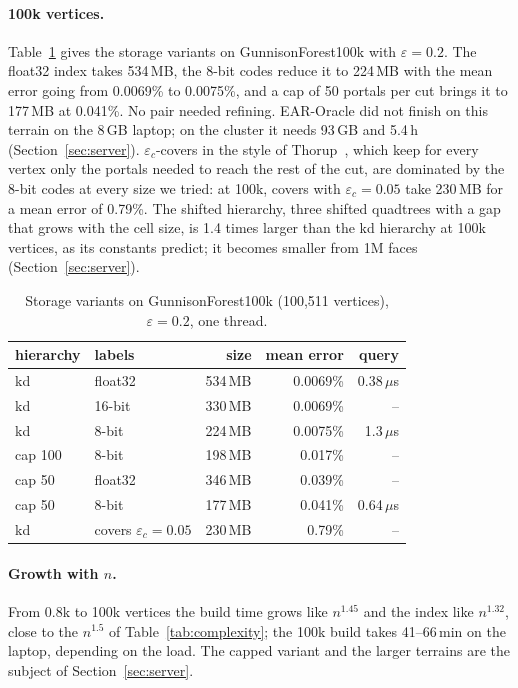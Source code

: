 \documentclass[sigconf,nonacm,screen]{acmart}
\newcommand{\eps}{\varepsilon}
\begin{document}
\paragraph{100k vertices.}
Table~\ref{tab:storage} gives the storage variants on GunnisonForest100k with $\eps=0.2$. The float32 index takes
534\,MB, the 8-bit codes reduce it to 224\,MB with the mean error going from 0.0069\% to 0.0075\%, and a cap of 50
portals per cut brings it to 177\,MB at 0.041\%. No pair needed refining. EAR-Oracle did not finish on this
terrain on the 8\,GB laptop; on the cluster it needs 93\,GB and 5.4\,h (Section~\ref{sec:server}). $\eps_c$-covers in the style of
Thorup~\cite{thorup2004compact}, which keep for every vertex only the portals needed to reach the rest of the cut,
are dominated by the 8-bit codes at every size we tried: at 100k, covers with $\eps_c=0.05$ take 230\,MB for a mean
error of 0.79\%. The shifted hierarchy, three shifted quadtrees with a gap that grows with the cell size,
is 1.4 times larger than the kd hierarchy at 100k vertices, as its constants predict; it becomes smaller from 1M
faces (Section~\ref{sec:server}).

\begin{table}[t]
\caption{Storage variants on GunnisonForest100k (100,511 vertices), $\eps=0.2$, one thread.}
\label{tab:storage}
\small
\begin{tabular}{@{}llrrr@{}}
\toprule
hierarchy & labels & size & mean error & query\\
\midrule
kd & float32 & 534\,MB & 0.0069\% & 0.38\,$\mu$s\\
kd & 16-bit & 330\,MB & 0.0069\% & --\\
kd & 8-bit & 224\,MB & 0.0075\% & 1.3\,$\mu$s\\
cap 100 & 8-bit & 198\,MB & 0.017\% & --\\
cap 50 & float32 & 346\,MB & 0.039\% & --\\
cap 50 & 8-bit & 177\,MB & 0.041\% & 0.64\,$\mu$s\\
kd & covers $\eps_c=0.05$ & 230\,MB & 0.79\% & --\\
\bottomrule
\end{tabular}
\end{table}

\paragraph{Growth with $n$.}
From 0.8k to 100k vertices the build time grows like $n^{1.45}$ and the index like $n^{1.32}$, close to the
$n^{1.5}$ of Table~\ref{tab:complexity}; the 100k build takes 41--66\,min on the laptop, depending on the load.
The capped variant and the larger terrains are the subject of Section~\ref{sec:server}.
\end{document}
